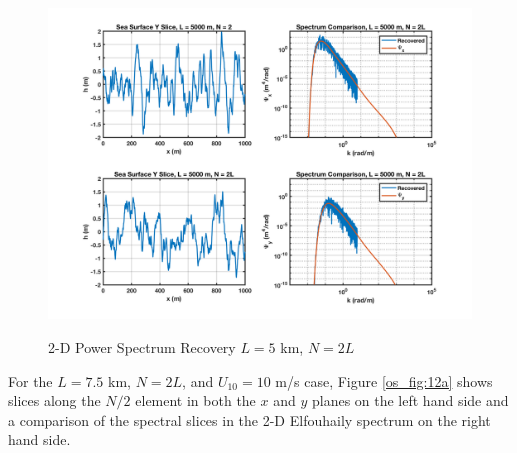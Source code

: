 \begin{figure}[ht]
  \begin{center}
\includegraphics[width=6in]{../media/Ocean_Surface/sea_surface_2d_slices_5000.png}
  \end{center}
  \renewcommand{\baselinestretch}{1} \small\normalsize
  \begin{quote}
    \caption[2-D Power Spectrum Recovery $L = 5$ km, $N = 2L$]{2-D Power Spectrum Recovery $L = 5$ km, $N = 2L$\label{os_fig:11a}}
  \end{quote}
\end{figure}
\renewcommand{\baselinestretch}{2} \small\normalsize
 
For the $L = 7.5$ km, $N = 2L$, and $U_{10} = 10$ m/s case, Figure \ref{os_fig:12a} shows slices along the $N/2$ element in both the $x$ and $y$ planes on the left hand side and a comparison of the spectral slices in the 2-D Elfouhaily spectrum on the right hand side.

